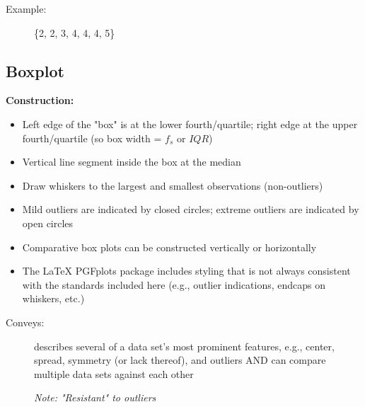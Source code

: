 \documentclass[12pt]{article}
\begin{document}
\begin{description}
\item[Example:] \{2, 2, 3, 4, 4, 4, 5\}

\begin{flushleft}
\end{flushleft}

\end{description}

\subsection{Boxplot}
    \textbf{Construction:}
    \begin{itemize}
        \item Left edge of the "box" is at the lower fourth/quartile; right edge at the upper fourth/quartile (so box width = $f_s$ or $IQR$)
        \item Vertical line segment inside the box at the median
        \item Draw whiskers to the largest and smallest observations (non-outliers)
        \item Mild outliers are indicated by closed circles; extreme outliers are indicated by open circles
        \item Comparative box plots can be constructed vertically or horizontally
        \item The LaTeX PGFplots package includes styling that is not always consistent with the standards included here (e.g., outlier indications, endcaps on whiskers, etc.)
    \end{itemize} 

    \begin{description}
        \item[Conveys:] describes several of a data set's most prominent features, e.g., center, spread, symmetry (or lack thereof), and outliers AND can compare multiple data sets against each other
        \item[] \textit{Note: "Resistant" to outliers} 
    \end{description}
\end{document}
